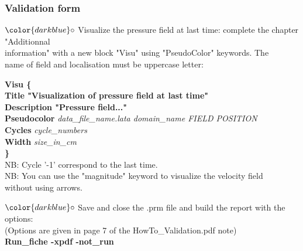 \documentclass[10pt]{beamer}
\begin{document}
\begin{frame}
\frametitle{Validation form}
\begin{block}{}

\hspace{1cm} $\color{darkblue}\circ$ {\small{Visualize the pressure field at last time: complete the chapter "Additionnal \\
\hspace{1.3cm} information" with a new block "Visu" using "PseudoColor" keywords. The \\
\hspace{1.3cm} name of field and localisation must be uppercase letter: }}

{\footnotesize{
\hspace{1.3cm} \textbf{Visu \{ } \\
\hspace{1.6cm} \textbf{Title "Visualization of pressure field at last time" } \\
\hspace{1.6cm} \textbf{Description "Pressure field..."} \\
\hspace{1.6cm} \textbf{Pseudocolor} \textit{data\_file\_name.lata domain\_name FIELD POSITION} \\
\hspace{1.6cm} \textbf{Cycles}  \textit{cycle\_numbers}\\
\hspace{1.6cm} \textbf{Width} \textit{size\_in\_cm} \\
\hspace{1.3cm} \textbf{\}} \\
}}
{\small{
\hspace{1.3cm} NB: Cycle '-1' correspond to the last time. \\
\hspace{1.3cm} NB: You can use the "magnitude" keyword to visualize the velocity field \\
\hspace{1.3cm} without using arrows.
}}
\vspace{0.2cm}

\hspace{1cm} $\color{darkblue}\circ$ {\small{ Save and close the .prm file and build the report with the options:\\
\hspace{1.3cm} (Options are given in page 7 of the HowTo\_Validation.pdf note) }}\\
\hspace{1.3cm} {\small{\textbf{Run\_fiche -xpdf -not\_run}}}

\end{block}
\end{frame}
\end{document}
